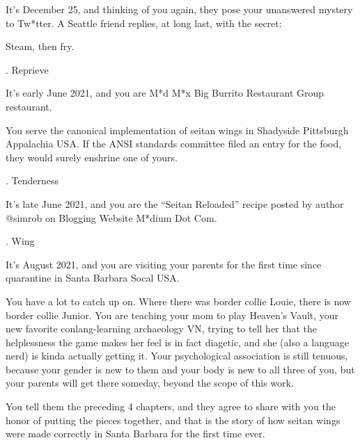 \documentclass[12pt]{article}
\newcommand\chapter[2]{{\thispagestyle{empty} \Large \sc #1. \quad #2

\vspace{1.5em}}}
\begin{document}
It's December 25, and thinking of you again, they pose your unanswered mystery to Tw*tter.
A Seattle friend replies, at long last, with the secret:

Steam, then fry.

\newpage \thispagestyle{empty}

\chapter{3}{Reprieve}

It's early June 2021, and you are M*d M*x Big Burrito Restaurant Group restaurant.

You serve the canonical implementation of seitan wings in Shadyside Pittsburgh Appalachia USA. If the ANSI standards committee filed an entry for the food, they would surely enshrine one of yours.


\newpage \thispagestyle{empty}

\chapter{4}{Tenderness}

It's late June 2021, and you are the ``Seitan Reloaded'' recipe posted by author {\sf @simrob} on Blogging Website M*dium Dot Com.


\newpage \thispagestyle{empty}

\chapter{5}{Wing}

It's August 2021, and you are visiting your parents for the first time since quarantine in Santa Barbara Socal USA.

You have a lot to catch up on.
Where there was border collie Louie, there is now border collie Junior.
You are teaching your mom to play Heaven's Vault,
your new favorite conlang-learning archaeology VN,
trying to tell her that the helplessness the game makes her feel is in fact diagetic,
and she (also a language nerd) is kinda actually getting it.
%
Your psychological association is still tenuous,
because your gender is new to them and your body is new to all three of you,
but your parents will get there someday, beyond the scope of this work.

You tell them the preceding 4 chapters,
and they agree to share with you the honor of putting the pieces together,
and that is the story of how seitan wings were made correctly in Santa Barbara for the first time ever.
\end{document}
